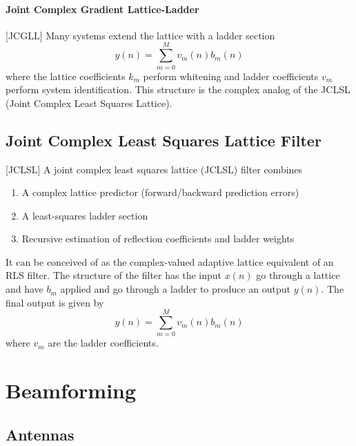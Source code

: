 \documentclass[11pt]{report}
\theoremstyle{example}
\begin{document}
\subsubsection{Joint Complex Gradient Lattice-Ladder}[JCGLL]
Many systems extend the lattice with a ladder section
\begin{equation}
	y(n)=\sum_{m=0}^M{v_m(n)b_m(n)}
\end{equation}
where the lattice coefficients $k_m$ perform whitening and ladder coefficients $v_m$ perform system identification.
This structure is the complex analog of the JCLSL (Joint Complex Least Squares Lattice).


\section{Joint Complex Least Squares Lattice Filter}[JCLSL]
A joint complex least squares lattice (JCLSL) filter combines
\begin{enumerate}
	\item A complex lattice predictor (forward/backward prediction errors)
	\item A least-squares ladder section
	\item Recursive estimation of reflection coefficients and ladder weights
\end{enumerate}
It can be conceived of as the complex-valued adaptive lattice equivalent of an RLS filter.
The structure of the filter has the input $x(n)$ go through a lattice and have $b_m$ applied and go through a ladder to produce an output $y(n)$. The final output is given by
\begin{equation}
	y(n)=\sum_{m=0}^M{v_m(n)b_m(n)}
\end{equation}
where $v_m$ are the ladder coefficients.

\chapter{Beamforming}
\section{Antennas}
\end{document}
